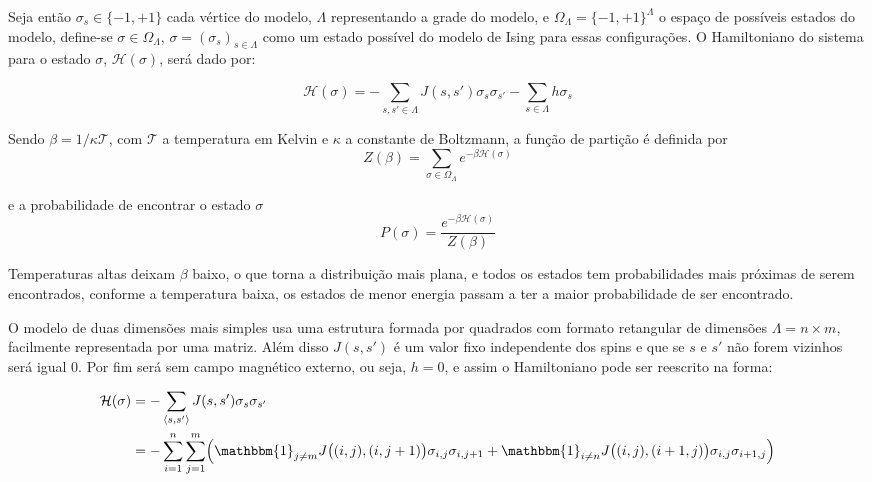 Seja então \( \sigma_s \in \{ -1, +1 \} \) cada vértice do modelo, \(\Lambda\) representando a grade do modelo, e \(\Omega_{\Lambda} = \{-1, +1 \} ^ {\Lambda} \) o espaço de possíveis estados do modelo, define-se \(\sigma \in  \Omega_{\Lambda}\), \( \sigma = (\sigma_s)_{s \in \Lambda} \) como um estado possível do modelo de Ising para essas configurações. O Hamiltoniano do sistema para o estado \(\sigma\), \(\mathcal{H}(\sigma)\), será dado por: 

\[ \mathcal{H}(\sigma) = -\sum_{s,s' \in \Lambda}J(s,s')\sigma_{s}\sigma_{s'} -\sum_{s \in \Lambda}h \sigma_s \]

Sendo \(\beta = 1/\kappa \mathcal{T}\), com \(\mathcal{T}\) a temperatura em Kelvin e \(\kappa \) a constante de Boltzmann, a função de partição é definida por
\[ Z(\beta) = \sum_{\sigma \in \Omega_{\Lambda}} e^{-\beta \mathcal{H}(\sigma)} \]

e a probabilidade de encontrar o estado \(\sigma \)
\[ P(\sigma) = \frac{e^{-\beta \mathcal{H}(\sigma)}}{Z(\beta)} \]

Temperaturas altas deixam \(\beta\) baixo, o que torna a distribuição mais plana, e todos os estados tem probabilidades mais próximas de serem encontrados, conforme a temperatura baixa, os estados de menor energia passam a ter a maior probabilidade de ser encontrado.

O modelo de duas dimensões mais simples usa uma estrutura formada por quadrados com formato retangular de dimensões \(\Lambda = n \times m\), facilmente representada por uma matriz. Além disso \(J(s, s')\) é um valor fixo independente dos spins e que se \(s\) e \(s'\) não forem vizinhos será igual 0. Por fim será sem campo magnético externo, ou seja, \(h = 0\), e assim o Hamiltoniano pode ser reescrito na forma:

\begin{align}
\mathcal{H}(\sigma) &= - \sum\limits_{\langle s, s' \rangle } J(s,s')\sigma_s \sigma_{s'}  \nonumber \\
	&= - \sum_{i = 1}^{n} \sum_{j = 1}^{m} \Bigl( \mathbbm{1}_{j \neq m}J\bigl((i,j),(i,j+1)\bigr)\sigma_{i,j}\sigma_{i,j+1} + \mathbbm{1}_{i \neq n}J\bigl((i,j),(i+1,j)\bigr)\sigma_{i,j}\sigma_{i+1,j} \Bigr)
\label{eq:Energia_modelo_ising}
\end{align}

